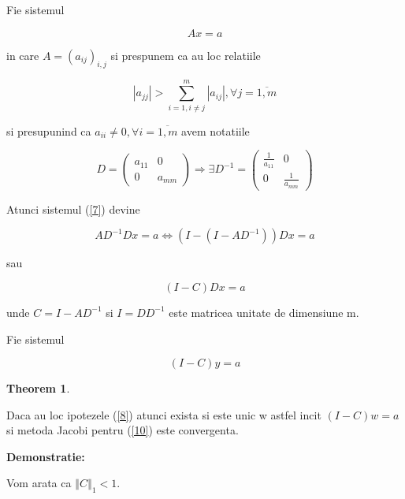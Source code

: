 \documentclass[a4paper,twoside]{book}
\newtheorem{theorem}{Theorem}
\begin{document}
Fie sistemul

\begin{equation}
Ax=a  \label{7}
\end{equation}

in care $A=(a_{ij})_{i,j}$ si prespunem ca au loc relatiile

\begin{equation}
\left\vert a_{jj}\right\vert >\sum_{i=1,i\neq j}^{m}\left\vert
a_{ij}\right\vert ,\forall j=\overline{1,m}  \label{8}
\end{equation}

si presupunind ca $a_{ii}\neq 0,\forall i=\overline{1,m}$ avem notatiile

\begin{equation*}
D=\left( 
\begin{array}{cc}
a_{11} & 0 \\ 
0 & a_{mm}%
\end{array}%
\right) \Rightarrow \exists D^{-1}=\left( 
\begin{array}{cc}
\frac{1}{a_{11}} & 0 \\ 
0 & \frac{1}{a_{mm}}%
\end{array}%
\right)
\end{equation*}

Atunci sistemul (\ref{7}) devine

\begin{equation*}
AD^{-1}Dx=a\Leftrightarrow (I-(I-AD^{-1}))Dx=a
\end{equation*}

sau

\begin{equation}
(I-C)Dx=a  \label{9}
\end{equation}

unde $C=I-AD^{-1}$ si $I=DD^{-1}$ este matricea unitate de dimensiune m.

Fie sistemul

\begin{equation}
(I-C)y=a  \label{10}
\end{equation}

\begin{theorem}
\label{Jacobi_col}
\end{theorem}

Daca au loc ipotezele (\ref{8}) atunci exista si este unic w astfel incit $%
(I-C)w=a$ si metoda Jacobi pentru (\ref{10}) este convergenta.

\textbf{Demonstratie:}

Vom arata ca $\left\Vert C\right\Vert _{1}<1$.
\end{document}
